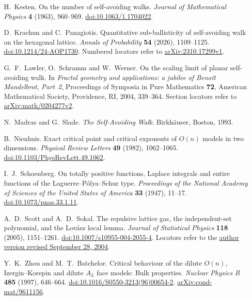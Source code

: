 H.~Kesten.
On the number of self-avoiding walks.
\emph{Journal of Mathematical Physics} \textbf{4} (1963), 960--969.
\href{https://doi.org/10.1063/1.1704022}{doi:10.1063/1.1704022}.

D.~Krachun and C.~Panagiotis.
Quantitative sub-ballisticity of self-avoiding walk on the hexagonal lattice.
\emph{Annals of Probability} \textbf{54} (2026), 1109--1125.
\href{https://doi.org/10.1214/24-AOP1730}{doi:10.1214/24-AOP1730}.
Numbered locators refer to \href{https://arxiv.org/abs/2310.17299v1}{arXiv:2310.17299v1}.

G.~F.~Lawler, O.~Schramm and W.~Werner.
On the scaling limit of planar self-avoiding walk.
In \emph{Fractal geometry and applications: a jubilee of Beno\^it Mandelbrot,
Part~2}, Proceedings of Symposia in Pure Mathematics \textbf{72},
American Mathematical Society, Providence, RI, 2004, 339--364.
Section locators refer to
\href{https://arxiv.org/abs/math/0204277v2}{arXiv:math/0204277v2}.

N.~Madras and G.~Slade.
\emph{The Self-Avoiding Walk}.
Birkh\"auser, Boston, 1993.

B.~Nienhuis.
Exact critical point and critical exponents of $O(n)$ models in two dimensions.
\emph{Physical Review Letters} \textbf{49} (1982), 1062--1065.
\href{https://doi.org/10.1103/PhysRevLett.49.1062}{doi:10.1103/PhysRevLett.49.1062}.

I.~J.~Schoenberg.
On totally positive functions, Laplace integrals and entire functions
of the Laguerre--P\'olya--Schur type.
\emph{Proceedings of the National Academy of Sciences of the United States
of America} \textbf{33} (1947), 11--17.
\href{https://doi.org/10.1073/pnas.33.1.11}{doi:10.1073/pnas.33.1.11}.

A.~D.~Scott and A.~D.~Sokal.
The repulsive lattice gas, the independent-set polynomial, and the
Lov\'asz local lemma.
\emph{Journal of Statistical Physics} \textbf{118} (2005), 1151--1261.
\href{https://doi.org/10.1007/s10955-004-2055-4}{doi:10.1007/s10955-004-2055-4}.
Locators refer to the
\href{https://people.maths.ox.ac.uk/~scott/Papers/lovasz.pdf}{author version
revised September 28, 2004}.

Y.~K.~Zhou and M.~T.~Batchelor.
Critical behaviour of the dilute $O(n)$, Izergin--Korepin and dilute
$A_L$ face models: Bulk properties.
\emph{Nuclear Physics B} \textbf{485} (1997), 646--664.
\href{https://doi.org/10.1016/S0550-3213(96)00654-2}{doi:10.1016/S0550-3213(96)00654-2}.
\href{https://arxiv.org/abs/cond-mat/9611156}{arXiv:cond-mat/9611156}.
